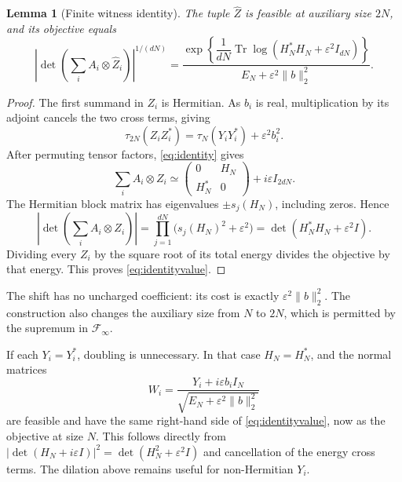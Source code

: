 \documentclass[11pt]{article}
\newtheorem{lemma}[theorem]{Lemma}
\newcommand{\Tr}{\operatorname{Tr}}
\newcommand{\F}{\mathcal F}
\begin{document}
\begin{lemma}[Finite witness identity]\label{lem:dilation}
The tuple $\widehat Z$ is feasible at auxiliary size $2N$, and its objective equals
\begin{equation}\label{eq:identityvalue}
 \left|\det\left(\sum_i A_i\otimes\widehat Z_i\right)\right|^{1/(dN)}
 =
 \frac{\exp\left\{\dfrac1{dN}\Tr\log(H_N^*H_N+\varepsilon^2I_{dN})\right\}}
 {E_N+\varepsilon^2\|b\|_2^2}.
\end{equation}
\end{lemma}
\begin{proof}
The first summand in $Z_i$ is Hermitian. As $b_i$ is real, multiplication by its adjoint cancels the two cross terms, giving
\[
 \tau_{2N}(Z_iZ_i^*)=\tau_N(Y_iY_i^*)+\varepsilon^2b_i^2.
\]
After permuting tensor factors, \eqref{eq:identity} gives
\[
 \sum_i A_i\otimes Z_i
 \simeq
 \begin{pmatrix}0&H_N\\H_N^*&0\end{pmatrix}
 +i\varepsilon I_{2dN}.
\]
The Hermitian block matrix has eigenvalues $\pm s_j(H_N)$, including zeros. Hence
\[
 \left|\det\left(\sum_i A_i\otimes Z_i\right)\right|
 =\prod_{j=1}^{dN}\bigl(s_j(H_N)^2+\varepsilon^2\bigr)
 =\det(H_N^*H_N+\varepsilon^2I).
\]
Dividing every $Z_i$ by the square root of its total energy divides the objective by that energy. This proves \eqref{eq:identityvalue}.
\end{proof}

The shift has no uncharged coefficient: its cost is exactly $\varepsilon^2\|b\|_2^2$. The construction also changes the auxiliary size from $N$ to $2N$, which is permitted by the supremum in $\F_\infty$.

If each $Y_i=Y_i^*$, doubling is unnecessary. In that case $H_N=H_N^*$, and the normal matrices
\begin{equation}\label{eq:nodouble}
 W_i=\frac{Y_i+i\varepsilon b_iI_N}{\sqrt{E_N+\varepsilon^2\|b\|_2^2}}
\end{equation}
are feasible and have the same right-hand side of \eqref{eq:identityvalue}, now as the objective at size $N$. This follows directly from $|\det(H_N+i\varepsilon I)|^2=\det(H_N^2+\varepsilon^2I)$ and cancellation of the energy cross terms. The dilation above remains useful for non-Hermitian $Y_i$.
\end{document}

